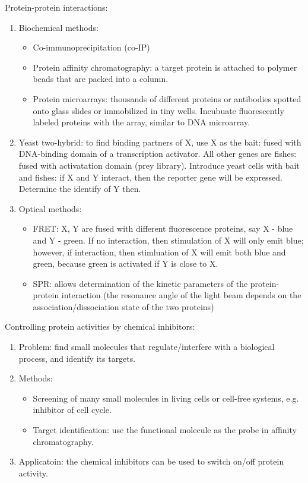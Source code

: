 \documentclass{report}
\begin{document}
Protein-protein interactions: 
\begin{enumerate}
\item Biochemical methods: 
\begin{itemize}
	\item Co-immunoprecipitation (co-IP)
	\item Protein affinity chromatography: a target protein is attached to polymer beads that are packed into a column. 
	\item Protein microarrays: thousands of different proteins or antibodies spotted onto glass slides or immobilized in tiny wells. Incubuate fluorescently labeled proteins with the array, similar to DNA microarray. 
\end{itemize}

\item Yeast two-hybrid: to find binding partners of X, use X as the bait: fused with DNA-binding domain of a transcription activator. All other genes are fishes: fused with activatation domain (prey library). Introduce yeast cells with bait and fishes: if X and Y interact, then the reporter gene will be expressed. Determine the identify of Y then. 

\item Optical methods: 
\begin{itemize}
\item FRET: X, Y are fused with different fluorescence proteins, say X - blue and Y - green. If no interaction, then stimulation of X will only emit blue; however, if interaction, then stimluation of X will emit both blue and green, because green is activated if Y is close to X.
 
\item SPR: allows determination of the kinetic parameters of the protein-protein interaction (the resonance angle of the light beam depends on the association/dissociation state of the two proteins)
\end{itemize}
\end{enumerate}

Controlling protein activities by chemical inhibitors: 
\begin{enumerate}
\item Problem: find small molecules that regulate/interfere with a biological process, and identify its targets.

\item Methods: 
\begin{itemize}
	\item Screening of many small molecules in living cells or cell-free systems, e.g. inhibitor of cell cycle. 
	\item Target identification: use the functional molecule as the probe in affinity chromatography. 
\end{itemize}

\item Applicatoin: the chemical inhibitors can be used to switch on/off protein activity. 
\end{enumerate}
\end{document}
